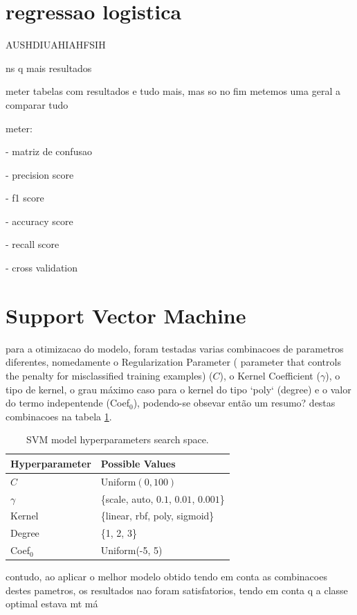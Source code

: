 \documentclass[conference]{IEEEtran}
\begin{document}
\section{regressao logistica}

AUSHDIUAHIAHFSIH

ns q mais resultados

meter tabelas com resultados e tudo mais, mas so no fim metemos uma geral a comparar tudo

meter:

- matriz de confusao

- precision score

- f1 score

- accuracy score

- recall score

- cross validation

\section{Support Vector Machine}

para a otimizacao do modelo, foram testadas varias combinacoes de parametros diferentes, nomedamente o Regularization Parameter ( parameter that controls the penalty for misclassified training examples) ($C$), o Kernel Coefficient ($\gamma$), o tipo de kernel, o grau máximo caso para o kernel do tipo `poly` (degree) e o valor do termo indepentende (Coef$_0$), podendo-se obsevar então um resumo? destas combinacoes na tabela \ref{parametrosSVM}.

\begin{table}[H]
\centering
\caption{SVM model hyperparameters search space.}
\label{parametrosSVM}
\begin{tabular}{ll}
\toprule
Hyperparameter & Possible Values \\
\midrule
$C$ & Uniform$(0, 100)$ \\ 
$\gamma$ & \{scale, auto, $0.1$, $0.01$, $0.001$\} \\ 
Kernel & \{linear, rbf, poly, sigmoid\} \\ 
Degree & \{1, 2, 3\} \\ 
Coef$_0$ & Uniform(-5, 5) \\
\bottomrule
\end{tabular}
\end{table}

contudo, ao aplicar o melhor modelo obtido tendo em conta as combinacoes destes pametros, os resultados nao foram satisfatorios, tendo em conta q a classe optimal estava mt má
\end{document}
